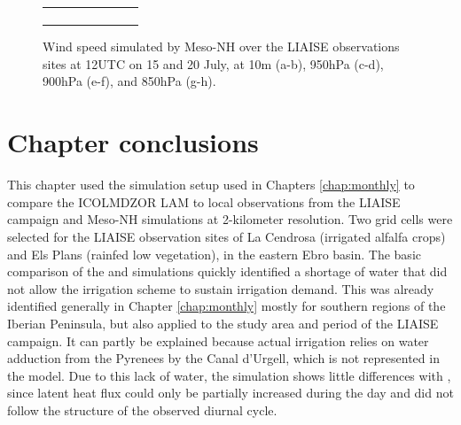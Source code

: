 \begin{figure}[hbtp]
\begin{tabular}{cc}
\begin{subfigure}[t]{0.5\textwidth}
        \end{subfigure} \\
    \end{tabular}
    \caption{Wind speed simulated by Meso-NH over the LIAISE observations sites at 12UTC on 15 and 20 July, at 10m (a-b), 950hPa (c-d), 900hPa (e-f), and 850hPa (g-h).}
    \label{fig:iop_days_winds}
\end{figure}

\clearpage

\section{Chapter conclusions}

This chapter used the simulation setup used in Chapters \ref{chap:monthly} to compare the ICOLMDZOR LAM to local observations from the LIAISE campaign and Meso-NH simulations at 2-kilometer resolution.
Two grid cells were selected for the LIAISE observation sites of La Cendrosa (irrigated alfalfa crops) and Els Plans (rainfed low vegetation), in the eastern Ebro basin.
The basic comparison of the \noirr and \irr simulations quickly identified a shortage of water that did not allow the irrigation scheme to sustain irrigation demand. This was already identified generally in Chapter \ref{chap:monthly} mostly for southern regions of the Iberian Peninsula, but also applied to the study area and period of the LIAISE campaign. It can partly be explained because actual irrigation relies on water adduction from the Pyrenees by the Canal d'Urgell, which is not represented in the model.
Due to this lack of water, the \irr simulation shows little differences with \noirr, since latent heat flux could only be partially increased during the day and did not follow the structure of the observed diurnal cycle.

